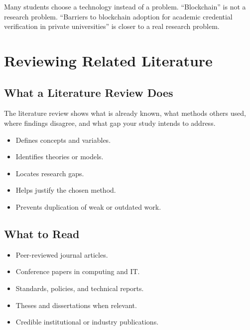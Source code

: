 \documentclass[11pt,a4paper]{article}
\begin{document}
\begin{alertbox}
Many students choose a technology instead of a problem. ``Blockchain'' is not a research problem. ``Barriers to blockchain adoption for academic credential verification in private universities'' is closer to a real research problem.
\end{alertbox}

\section{Reviewing Related Literature}

\subsection{What a Literature Review Does}

\begin{conceptbox}
The literature review shows what is already known, what methods others used, where findings disagree, and what gap your study intends to address.
\end{conceptbox}

\begin{itemize}[leftmargin=*]
  \item Defines concepts and variables.
  \item Identifies theories or models.
  \item Locates research gaps.
  \item Helps justify the chosen method.
  \item Prevents duplication of weak or outdated work.
\end{itemize}

\subsection{What to Read}

\begin{itemize}[leftmargin=*]
  \item Peer-reviewed journal articles.
  \item Conference papers in computing and IT.
  \item Standards, policies, and technical reports.
  \item Theses and dissertations when relevant.
  \item Credible institutional or industry publications.
\end{itemize}
\end{document}
